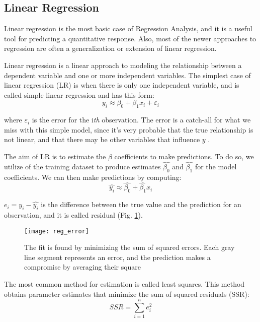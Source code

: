 \subsection{Linear Regression} \label{lin_reg}
Linear regression is the most basic case of Regression Analysis, and it is a useful tool for predicting a quantitative response. Also, most of the newer approaches to regression are often a generalization or extension of linear regression.

Linear regression is a linear approach to modeling the relationship between a dependent variable and one or more independent variables. The simplest case of linear regression (LR) is when there is only one independent variable, and is called simple linear regression \cite{wiki:lin_reg} and has this form:
\begin{equation}
	y_i \approx \beta_0 + \beta_1x_i + \varepsilon_i
\end{equation}

where $\varepsilon_i$ is the error for the i\textit{th} observation. The error is a catch-all for what we miss with this simple model, since it's very probable that the true relationship is not linear, and that there may be other variables that influence $y$ \cite{ISLR}.

The aim of LR is to estimate the $\beta$ coefficients to make predictions. To do so, we utilize of the training dataset to produce estimates $\widehat{\beta_0}$ and $\widehat{\beta_1}$ for the model coefficients. We can then make predictions by computing:
\begin{equation}
	\widehat{y_i} \approx \widehat{\beta_0} + {\widehat{\beta_1}x_i}
\end{equation}

$e_i = y_i - \widehat{y_i}$ is the difference between the true value and the prediction for an observation, and it is called residual (Fig. \ref{fig:reg_error}).

\begin{figure}[H]
	\centering
	\texttt{[image: reg\_error]}
	\caption{The fit is found by minimizing the sum of squared errors. Each gray line segment represents an error, and the prediction makes a compromise by averaging their square \cite{ISLR}}
	\label{fig:reg_error}
\end{figure}

The most common method for estimation is called least squares. This method obtains parameter estimates that minimize the sum of squared residuals (SSR):
\begin{equation}
	SSR=\sum _{i=1}^{n}e_{i}^{2}
\end{equation}

